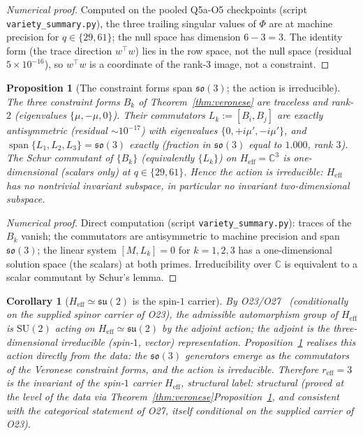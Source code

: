 \documentclass[12pt,a4paper]{article}
\newtheorem{proposition}[theorem]{Proposition}
\newtheorem{corollary}[theorem]{Corollary}
\theoremstyle{remark}
\DeclareMathOperator{\Span}{span}
\newcommand{\su}{\mathfrak{su}}
\newcommand{\Heff}{H_{\mathrm{eff}}}
\newcommand{\reff}{r_{\mathrm{eff}}}
\begin{document}
    \begin{proof}[Numerical proof]
      Computed on the pooled Q5a-O5 checkpoints (script \texttt{variety\_summary.py}), the three trailing singular
      values of $\Phi$ are at machine precision for $q \in \{29, 61\}$; the null space has dimension $6 - 3 = 3$.
      The identity form (the trace direction $w^{\top}w$) lies in the row space, not the null space (residual
      $5 \times 10^{-16}$), so $w^{\top}w$ is a coordinate of the rank-$3$ image, not a constraint.
    \end{proof}

    \begin{proposition}[The constraint forms span $\mathfrak{so}(3)$; the action is irreducible]
      \label{prop:so3}
      The three constraint forms $B_k$ of Theorem~\ref{thm:veronese} are traceless and rank-$2$ (eigenvalues
      $\{\mu, -\mu, 0\}$).
      Their commutators $L_k := [B_i, B_j]$ are exactly antisymmetric (residual $\sim 10^{-17}$) with eigenvalues
      $\{0, +i\mu', -i\mu'\}$, and $\Span\{L_1, L_2, L_3\} = \mathfrak{so}(3)$ exactly (fraction in
      $\mathfrak{so}(3)$ equal to $1.000$, rank $3$).
      The Schur commutant of $\{B_k\}$ (equivalently $\{L_k\}$) on $\Heff = \mathbb{C}^3$ is one-dimensional
      (scalars only) at $q \in \{29, 61\}$.
      Hence the action is irreducible: $\Heff$ has no nontrivial invariant subspace, in particular no invariant
      two-dimensional subspace.
    \end{proposition}

    \begin{proof}[Numerical proof]
      Direct computation (script \texttt{variety\_summary.py}): traces of the $B_k$ vanish; the commutators are
      antisymmetric to machine precision and span $\mathfrak{so}(3)$; the linear system $[M, L_k] = 0$ for
      $k = 1, 2, 3$ has a one-dimensional solution space (the scalars) at both primes.
      Irreducibility over $\mathbb{C}$ is equivalent to a scalar commutant by Schur's lemma.
    \end{proof}

    \begin{corollary}[$\Heff \simeq \su(2)$ is the spin-$1$ carrier]
      \label{cor:adjoint}
      By O23/O27~\cite{Beau2026a27,Beau2026a31} (conditionally on the supplied spinor carrier
      of O23), the admissible automorphism group of $\Heff$ is $\mathrm{SU}(2)$
      acting on $\Heff \simeq \su(2)$ by the adjoint action; the adjoint is the three-dimensional irreducible (spin-$1$,
      vector) representation.
      Proposition~\ref{prop:so3} realises this action directly from the data: the $\mathfrak{so}(3)$ generators emerge
      as the commutators of the Veronese constraint forms, and the action is irreducible.
      Therefore $\reff = 3$ is the invariant of the spin-$1$ carrier $\Heff$, structural label: \emph{structural}
      (proved at the level of the data via Theorem~\ref{thm:veronese}\textendash{}Proposition~\ref{prop:so3}, and
      consistent with the categorical statement of O27, itself conditional on the supplied
      carrier of O23).
    \end{corollary}
\end{document}
